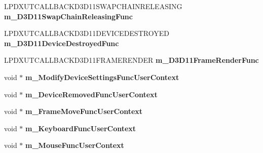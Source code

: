 \begin{DoxyCompactItemize}
\item 
\hypertarget{struct_d_x_u_t_state_1_1_s_t_a_t_e_a691da9a1de4efbea0ac63918e76273c8}{L\+P\+D\+X\+U\+T\+C\+A\+L\+L\+B\+A\+C\+K\+D3\+D11\+S\+W\+A\+P\+C\+H\+A\+I\+N\+R\+E\+L\+E\+A\+S\+I\+N\+G {\bfseries m\+\_\+\+D3\+D11\+Swap\+Chain\+Releasing\+Func}}\label{struct_d_x_u_t_state_1_1_s_t_a_t_e_a691da9a1de4efbea0ac63918e76273c8}

\item 
\hypertarget{struct_d_x_u_t_state_1_1_s_t_a_t_e_a315b6716cd3cfc770eb7f9a8256efa03}{L\+P\+D\+X\+U\+T\+C\+A\+L\+L\+B\+A\+C\+K\+D3\+D11\+D\+E\+V\+I\+C\+E\+D\+E\+S\+T\+R\+O\+Y\+E\+D {\bfseries m\+\_\+\+D3\+D11\+Device\+Destroyed\+Func}}\label{struct_d_x_u_t_state_1_1_s_t_a_t_e_a315b6716cd3cfc770eb7f9a8256efa03}

\item 
\hypertarget{struct_d_x_u_t_state_1_1_s_t_a_t_e_a4fde25903b79595aebba204fb115d124}{L\+P\+D\+X\+U\+T\+C\+A\+L\+L\+B\+A\+C\+K\+D3\+D11\+F\+R\+A\+M\+E\+R\+E\+N\+D\+E\+R {\bfseries m\+\_\+\+D3\+D11\+Frame\+Render\+Func}}\label{struct_d_x_u_t_state_1_1_s_t_a_t_e_a4fde25903b79595aebba204fb115d124}

\item 
\hypertarget{struct_d_x_u_t_state_1_1_s_t_a_t_e_aa82feb03854adbaa82dcad585968f0af}{void $\ast$ {\bfseries m\+\_\+\+Modify\+Device\+Settings\+Func\+User\+Context}}\label{struct_d_x_u_t_state_1_1_s_t_a_t_e_aa82feb03854adbaa82dcad585968f0af}

\item 
\hypertarget{struct_d_x_u_t_state_1_1_s_t_a_t_e_a56a93dbabd7a66573a2c0348144442bb}{void $\ast$ {\bfseries m\+\_\+\+Device\+Removed\+Func\+User\+Context}}\label{struct_d_x_u_t_state_1_1_s_t_a_t_e_a56a93dbabd7a66573a2c0348144442bb}

\item 
\hypertarget{struct_d_x_u_t_state_1_1_s_t_a_t_e_a110968f3db2e93ceffdf75eb49ffa766}{void $\ast$ {\bfseries m\+\_\+\+Frame\+Move\+Func\+User\+Context}}\label{struct_d_x_u_t_state_1_1_s_t_a_t_e_a110968f3db2e93ceffdf75eb49ffa766}

\item 
\hypertarget{struct_d_x_u_t_state_1_1_s_t_a_t_e_aa4047cd7134c8af8e567720e521992c5}{void $\ast$ {\bfseries m\+\_\+\+Keyboard\+Func\+User\+Context}}\label{struct_d_x_u_t_state_1_1_s_t_a_t_e_aa4047cd7134c8af8e567720e521992c5}

\item 
\hypertarget{struct_d_x_u_t_state_1_1_s_t_a_t_e_aaccf619ab6ad3da01bdecc0fd6c51e79}{void $\ast$ {\bfseries m\+\_\+\+Mouse\+Func\+User\+Context}}\label{struct_d_x_u_t_state_1_1_s_t_a_t_e_aaccf619ab6ad3da01bdecc0fd6c51e79}


\end{DoxyCompactItemize}
